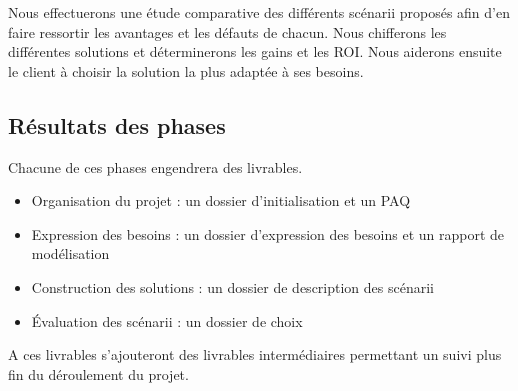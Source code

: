 Nous effectuerons une \'etude comparative des diff\'erents sc\'enarii propos\'es afin d'en faire ressortir les avantages et les d\'efauts de chacun.
Nous chifferons les diff\'erentes solutions et d\'eterminerons les gains et les ROI.
Nous aiderons ensuite le client \`a choisir la solution la plus adapt\'ee \`a ses besoins.


\subsection*{R\'esultats des phases}

Chacune de ces phases engendrera des livrables.

\begin{itemize}
 \item Organisation du projet : un dossier d'initialisation et un PAQ
 \item Expression des besoins : un dossier d'expression des besoins et un rapport de mod\'elisation
 \item Construction des solutions : un dossier de description des sc\'enarii
 \item \'Evaluation des sc\'enarii : un dossier de choix
\end{itemize}

A ces livrables s'ajouteront des livrables interm\'ediaires permettant un suivi plus fin du d\'eroulement du projet.
